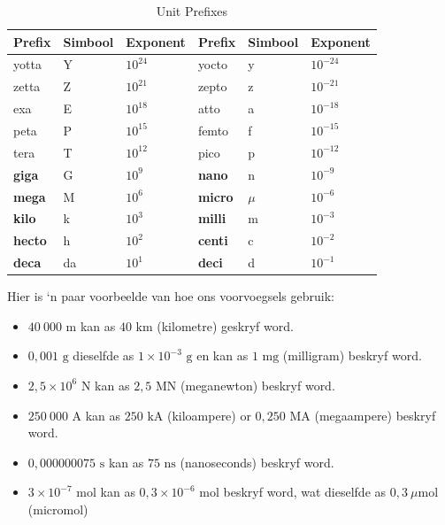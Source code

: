 \begin{table}[H]
        \begin{center}
    \noindent
      \begin{tabular}{|l|l|l|l|l|l|}\hline
\textbf{Prefix} & \textbf{Simbool}  & \textbf{Exponent} & \textbf{Prefix} & \textbf{Simbool} & \textbf{Exponent} \\ \hline
yotta           & Y                & ${10}^{24}$       & yocto           & y               & ${10}^{-24}$      \\ \hline
zetta           &  Z               & ${10}^{21}$       &  zepto          & z               & ${10}^{-21}$      \\ \hline
exa             &  E               & ${10}^{18}$       & atto            & a               & ${10}^{-18}$      \\ \hline
peta            & P                & ${10}^{15}$       & femto           & f               & ${10}^{-15}$      \\ \hline
tera            &  T               & ${10}^{12}$       &  pico           & p               & ${10}^{-12}$      \\ \hline
\textbf{giga}   & G                & ${10}^{9}$        & \textbf{nano}   & n               & ${10}^{-9}$       \\ \hline
\textbf{mega}   &  M               & ${10}^{6}$        & \textbf{micro}  & $\mu $          & ${10}^{-6}$       \\ \hline
\textbf{kilo}   &  k               & ${10}^{3}$        & \textbf{milli}  & m               & ${10}^{-3}$       \\ \hline
\textbf{hecto}  &  h               & ${10}^{2}$        & \textbf{centi}  & c               & ${10}^{-2}$       \\ \hline
\textbf{deca}   &  da              & ${10}^{1}$        & \textbf{deci}   & d               & ${10}^{-1}$       \\ \hline
    \end{tabular}
\caption{Unit Prefixes}
      \end{center}
\label{tab:unitprefixes}
\end{table}
Hier is ‘n paar voorbeelde van hoe ons voorvoegsels gebruik:
\begin{itemize}[noitemsep]
  \item $40~000 \text{ m}$ kan as $40 \text{ km}$ (kilometre) geskryf word.
  \item $0,001 \text{ g}$ dieselfde as $1 \times{10}^{-3} \text{ g}$ en kan as $1 \text{ mg}$ (milligram) beskryf word.
  \item $2,5 \times {10}^{6}$ N kan as $2,5 \text{ MN}$ (meganewton) beskryf word.
  \item $250~000 \text{ A}$ kan as $250 \text{ kA}$ (kiloampere) or $0,250 \text{ MA}$ (megaampere) beskryf word.
  \item $0,000000075 \text{ s}$ kan as $75 \text{ ns}$ (nanoseconds) beskryf word.
  \item $3 \times{10}^{-7} \text{ mol}$ kan as $0,3 \times{10}^{-6} \text{ mol}$ beskryf word, wat dieselfde as $0,3 ~\mu \text{mol}$ (micromol)
\end{itemize}
